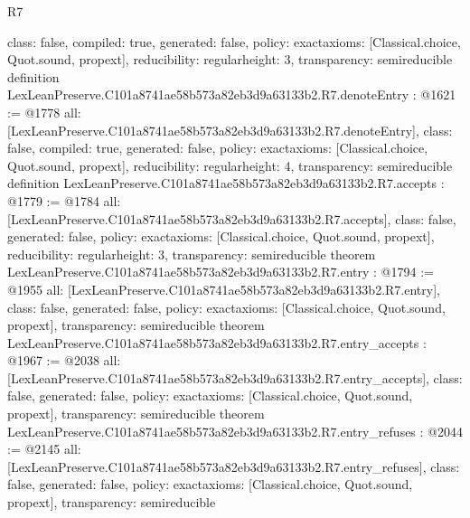 \begin{lexlean}{R7}
\begin{coremodule}
{  class: false,
  compiled: true,
  generated: false,
  policy: exact{axioms: [Classical.choice, Quot.sound, propext]},
  reducibility: regular{height: 3},
  transparency: semireducible
}
definition LexLeanPreserve.C101a8741ae58b573a82eb3d9a63133b2.R7.denoteEntry : @1621 := @1778 {
  all: [LexLeanPreserve.C101a8741ae58b573a82eb3d9a63133b2.R7.denoteEntry],
  class: false,
  compiled: true,
  generated: false,
  policy: exact{axioms: [Classical.choice, Quot.sound, propext]},
  reducibility: regular{height: 4},
  transparency: semireducible
}
definition LexLeanPreserve.C101a8741ae58b573a82eb3d9a63133b2.R7.accepts : @1779 := @1784 {
  all: [LexLeanPreserve.C101a8741ae58b573a82eb3d9a63133b2.R7.accepts],
  class: false,
  generated: false,
  policy: exact{axioms: [Classical.choice, Quot.sound, propext]},
  reducibility: regular{height: 3},
  transparency: semireducible
}
theorem LexLeanPreserve.C101a8741ae58b573a82eb3d9a63133b2.R7.entry : @1794 := @1955 {
  all: [LexLeanPreserve.C101a8741ae58b573a82eb3d9a63133b2.R7.entry],
  class: false,
  generated: false,
  policy: exact{axioms: [Classical.choice, Quot.sound, propext]},
  transparency: semireducible
}
theorem LexLeanPreserve.C101a8741ae58b573a82eb3d9a63133b2.R7.entry_accepts : @1967 := @2038 {
  all: [LexLeanPreserve.C101a8741ae58b573a82eb3d9a63133b2.R7.entry_accepts],
  class: false,
  generated: false,
  policy: exact{axioms: [Classical.choice, Quot.sound, propext]},
  transparency: semireducible
}
theorem LexLeanPreserve.C101a8741ae58b573a82eb3d9a63133b2.R7.entry_refuses : @2044 := @2145 {
  all: [LexLeanPreserve.C101a8741ae58b573a82eb3d9a63133b2.R7.entry_refuses],
  class: false,
  generated: false,
  policy: exact{axioms: [Classical.choice, Quot.sound, propext]},
  transparency: semireducible
}


\end{coremodule}
\end{lexlean}
